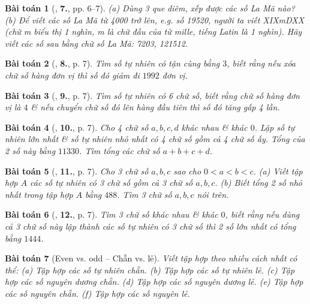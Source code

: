 \documentclass{article}
\newtheorem{baitoan}{Bài toán}
\begin{document}
\begin{baitoan}[\cite{Binh_Toan_6_tap_1}, \textbf{7.}, pp. 6--7]
	(a) Dùng 3 que diêm, xếp được các số La Mã nào? (b) Để viết các số La Mã từ 4000 trở lên, e.g. số 19520, người ta viết XIXmDXX (chữ m biểu thị \emph{1 nghìn}, m là chữ đầu của từ \emph{mille}, tiếng Latin là 1 nghìn). Hãy viết các số sau bằng chữ số La Mã: 7203, 121512.
\end{baitoan}

\begin{baitoan}[\cite{Binh_Toan_6_tap_1}, \textbf{8.}, p. 7]
	Tìm số tự nhiên có tận cùng bằng $3$, biết rằng nếu xóa chữ số hàng đơn vị thì số đó giảm đi $1992$ đơn vị.
\end{baitoan}

\begin{baitoan}[\cite{Binh_Toan_6_tap_1}, \textbf{9.}, p. 7]
	Tìm số tự nhiên có 6 chữ số, biết rằng chữ số hàng đơn vị là $4$ \& nếu chuyển chữ số đó lên hàng đầu tiên thì số đó tăng gấp 4 lần.
\end{baitoan}

\begin{baitoan}[\cite{Binh_Toan_6_tap_1}, \textbf{10.}, p. 7]
	Cho 4 chữ số $a,b,c,d$ khác nhau \& khác $0$. Lập số tự nhiên lớn nhất \& số tự nhiên nhỏ nhất có 4 chữ số gồm cả 4 chữ số ấy. Tổng của 2 số này bằng $11330$. Tìm tổng các chữ số $a + b + c + d$.
\end{baitoan}

\begin{baitoan}[\cite{Binh_Toan_6_tap_1}, \textbf{11.}, p. 7]
	Cho 3 chữ số $a,b,c$ sao cho $0 < a < b < c$. (a) Viết tập hợp $A$ các số tự nhiên có 3 chữ số gồm cả 3 chữ số $a,b,c$. (b) Biết tổng 2 số nhỏ nhất trong tập hợp $A$ bằng $488$. Tìm 3 chữ số $a,b,c$ nói trên.
\end{baitoan}

\begin{baitoan}[\cite{Binh_Toan_6_tap_1}, \textbf{12.}, p. 7]
	Tìm 3 chữ số khác nhau \& khác $0$, biết rằng nếu dùng cả 3 chữ số này lập thành các số tự nhiên có 3 chữ số thì 2 số lớn nhất có tổng bằng $1444$.
\end{baitoan}

\begin{baitoan}[Even vs. odd -- Chẵn vs. lẻ]
	Viết tập hợp theo nhiều cách nhất có thể: (a) Tập hợp các số tự nhiên chẵn. (b) Tập hợp các số tự nhiên lẻ. (c) Tập hợp các số nguyên dương chẵn. (d) Tập hợp các số nguyên dương lẻ. (e) Tập hợp các số nguyên chẵn. (f) Tập hợp các số nguyên lẻ.
\end{baitoan}
\end{document}

